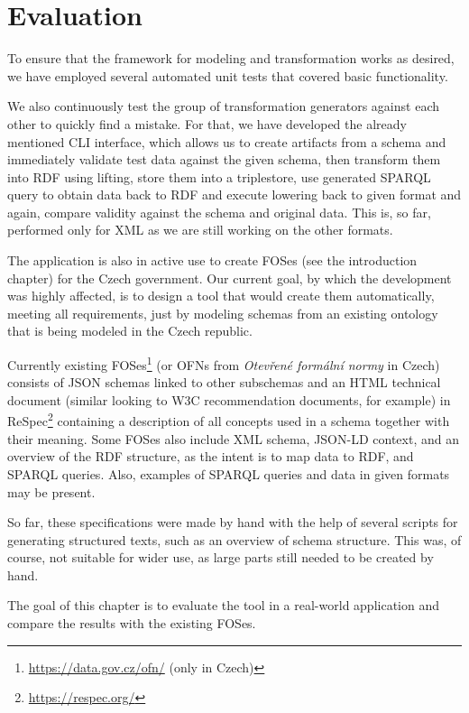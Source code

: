 \chapter{Evaluation}
\label{chapters:evaluation}

To ensure that the framework for modeling and transformation works as desired, we have employed several automated unit tests that covered basic functionality.

We also continuously test the group of transformation generators against each other to quickly find a mistake. For that, we have developed the already mentioned CLI interface, which allows us to create artifacts from a schema and immediately validate test data against the given schema, then transform them into RDF using lifting, store them into a triplestore, use generated SPARQL query to obtain data back to RDF and execute lowering back to given format and again, compare validity against the schema and original data. This is, so far, performed only for XML as we are still working on the other formats.

\medskip

The application is also in active use to create FOSes (see the introduction chapter) for the Czech government. Our current goal, by which the development was highly affected, is to design a tool that would create them automatically, meeting all requirements, just by modeling schemas from an existing ontology that is being modeled \cite{kvremen2019improving} in the Czech republic.

Currently existing FOSes\footnote{\url{https://data.gov.cz/ofn/} (only in Czech)} (or OFNs from \textit{Otevřené formální normy} in Czech) consists of JSON schemas linked to other subschemas and an HTML technical document (similar looking to W3C recommendation documents, for example) in ReSpec\footnote{\url{https://respec.org/}} containing a description of all concepts used in a schema together with their meaning. Some FOSes also include XML schema, JSON-LD context, and an overview of the RDF structure, as the intent is to map data to RDF, and SPARQL queries. Also, examples of SPARQL queries and data in given formats may be present.

So far, these specifications were made by hand with the help of several scripts for generating structured texts, such as an overview of schema structure. This was, of course, not suitable for wider use, as large parts still needed to be created by hand.

The goal of this chapter is to evaluate the tool in a real-world application and compare the results with the existing FOSes.


